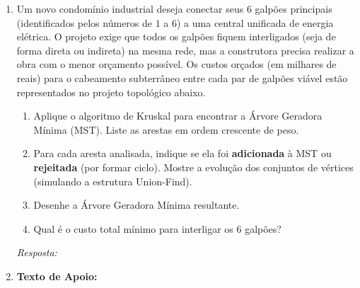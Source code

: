 \documentclass[12pt,a4paper]{article}
\newcommand{\quadro}[1]{\vspace{0.2cm}\begin{tcolorbox}[colback=white, colframe=black, height=#1, boxrule=0.5pt, arc=0pt] \textit{Resposta:} \end{tcolorbox}}
\begin{document}
\begin{enumerate}
\item Um novo condomínio industrial deseja conectar seus 6 galpões principais (identificados pelos números de $1$ a $6$) a uma central unificada de energia elétrica. O projeto exige que todos os galpões fiquem interligados (seja de forma direta ou indireta) na mesma rede, mas a construtora precisa realizar a obra com o menor orçamento possível. Os custos orçados (em milhares de reais) para o cabeamento subterrâneo entre cada par de galpões viável estão representados no projeto topológico abaixo.

\begin{center}
\end{center}

\begin{enumerate}[label=\alph*)]
    \item Aplique o algoritmo de Kruskal para encontrar a Árvore Geradora Mínima (MST). Liste as arestas em ordem crescente de peso.
    \item Para cada aresta analisada, indique se ela foi \textbf{adicionada} à MST ou \textbf{rejeitada} (por formar ciclo). Mostre a evolução dos conjuntos de vértices (simulando a estrutura Union-Find).
    \item Desenhe a Árvore Geradora Mínima resultante.
    \item Qual é o custo total mínimo para interligar os 6 galpões?
\end{enumerate}
\quadro{12cm} 

\item \textbf{Texto de Apoio:}
\vspace{0.3cm}


\end{enumerate}
\end{document}
